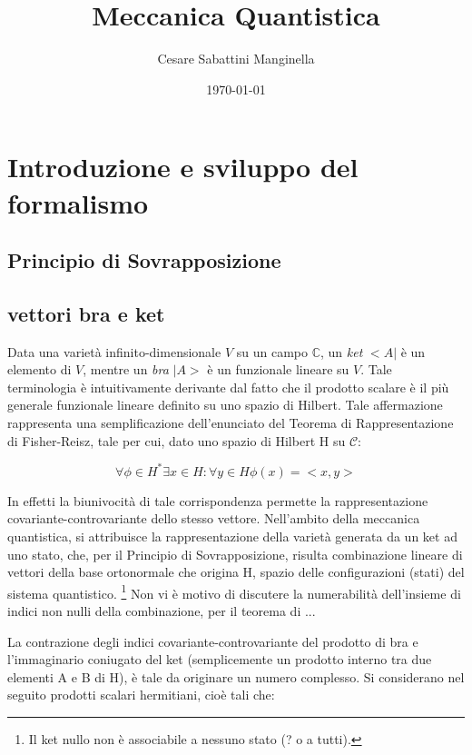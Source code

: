 \documentclass{article}
\title{Meccanica Quantistica}
\author{Cesare Sabattini Manginella}
\date{\today}
\begin{document}
\maketitle

\section{Introduzione e sviluppo del formalismo}

\subsection{Principio di Sovrapposizione}
\subsection{vettori bra e ket}
Data una varietà infinito-dimensionale $V$ su un campo $\mathbb{C}$, un \emph{ket} $<A|$ è un elemento di $V$, mentre un \emph{bra} $|A>$ è un funzionale lineare su $V$.
Tale terminologia è intuitivamente derivante dal fatto che il prodotto scalare è il più generale funzionale lineare definito su uno spazio di Hilbert.
Tale affermazione rappresenta una semplificazione dell'enunciato del Teorema di Rappresentazione di Fisher-Reisz, tale per cui, dato uno spazio di Hilbert H su $\mathcal{C}$:

\begin{equation}
    \forall \phi \in H^* \exists x \in H : \forall y \in H \phi(x)=<x,y>
\end{equation}

In effetti la biunivocità di tale corrispondenza permette la rappresentazione covariante-controvariante dello stesso vettore.
Nell'ambito della meccanica quantistica, si attribuisce la rappresentazione della varietà generata da un ket ad uno stato, che, per il Principio di Sovrapposizione,
risulta combinazione lineare di vettori della base ortonormale che origina H, spazio delle configurazioni (stati) del sistema quantistico.
\footnote[2]{
    Il ket nullo non è associabile a nessuno stato (? o a tutti).
}
Non vi è motivo di discutere la numerabilità dell'insieme di indici non nulli della combinazione, per il teorema di ...

La contrazione degli indici covariante-controvariante del prodotto di bra e l'immaginario coniugato del ket (semplicemente un prodotto interno tra due elementi A e B di H),
è tale da originare un numero complesso.
Si considerano nel seguito prodotti scalari hermitiani, cioè tali che:
\end{document}
